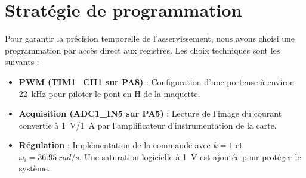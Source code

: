 \documentclass[11pt]{report}
\begin{document}
\section*{Stratégie de programmation}
Pour garantir la précision temporelle de l'asservissement, nous avons choisi une programmation par accès direct aux registres. Les choix techniques sont les suivants :
\begin{itemize}
    \item \textbf{PWM (TIM1\_CH1 sur PA8)} : Configuration d'une porteuse à environ \qty{22}{kHz} pour piloter le pont en H de la maquette.
    \item \textbf{Acquisition (ADC1\_IN5 sur PA5)} : Lecture de l'image du courant convertie à \qty{1}{V}/\qty{1}{A} par l'amplificateur d'instrumentation de la carte.
    \item \textbf{Régulation} : Implémentation de la commande avec $k=1$ et $\omega_i = \qty{36,95}{rad/s}$. Une saturation logicielle à \qty{1}{V} est ajoutée pour protéger le système.
\end{itemize}
\end{document}
